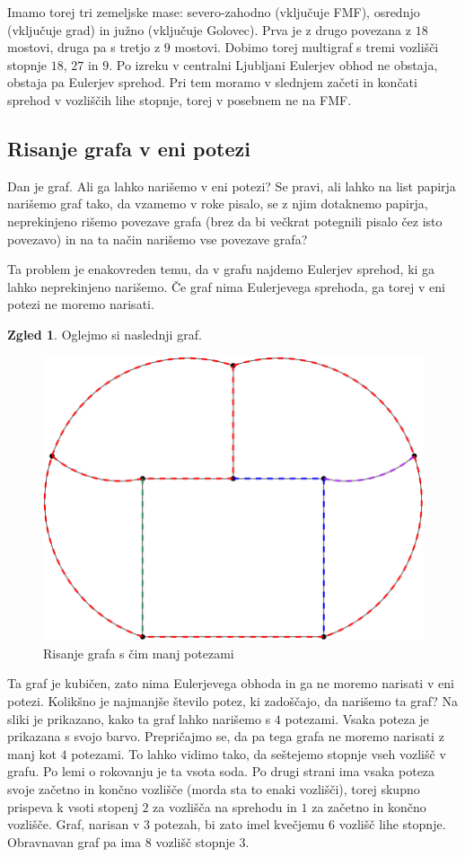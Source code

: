 \documentclass[11pt]{book}
\theoremstyle{definition}
\theoremstyle{zgled}
\newtheorem*{zgled}{Zgled}
\theoremstyle{odprtproblem}
\theoremstyle{domacanaloga}
\theoremstyle{izrek}
\begin{document}
Imamo torej tri zemeljske mase: severo-zahodno (vključuje FMF), osrednjo (vključuje grad) in južno (vključuje Golovec). Prva je z drugo povezana z $18$ mostovi, druga pa s tretjo z $9$ mostovi. Dobimo torej multigraf s tremi vozlišči stopnje $18$, $27$ in $9$. Po izreku v centralni Ljubljani Eulerjev obhod ne obstaja, obstaja pa Eulerjev sprehod. Pri tem moramo v slednjem začeti in končati sprehod v vozliščih lihe stopnje, torej v posebnem ne na FMF.

\subsection{Risanje grafa v eni potezi}

Dan je graf. Ali ga lahko narišemo v eni potezi? Se pravi, ali lahko na list papirja narišemo graf tako, da vzamemo v roke pisalo, se z njim dotaknemo papirja, neprekinjeno rišemo povezave grafa (brez da bi večkrat potegnili pisalo čez isto povezavo) in na ta način narišemo vse povezave grafa? 

Ta problem je enakovreden temu, da v grafu najdemo Eulerjev sprehod, ki ga lahko neprekinjeno narišemo. Če graf nima Eulerjevega sprehoda, ga torej v eni potezi ne moremo narisati.

\begin{zgled}
Oglejmo si naslednji graf.

\begin{figure}[h]
    \centering
    \includegraphics[width=0.5\linewidth]{img/grafi-enapoteza.png}
    \caption{Risanje grafa s čim manj potezami}
\end{figure}    

Ta graf je kubičen, zato nima Eulerjevega obhoda in ga ne moremo narisati v eni potezi. Kolikšno je najmanjše število potez, ki zadoščajo, da narišemo ta graf? Na sliki je prikazano, kako ta graf lahko narišemo s $4$ potezami. Vsaka poteza je prikazana s svojo barvo. Prepričajmo se, da pa tega grafa ne moremo narisati z manj kot $4$ potezami. To lahko vidimo tako, da seštejemo stopnje vseh vozlišč v grafu. Po lemi o rokovanju je ta vsota soda. Po drugi strani ima vsaka poteza svoje začetno in končno vozlišče (morda sta to enaki vozlišči), torej skupno prispeva k vsoti stopenj $2$ za vozlišča na sprehodu in $1$ za začetno in končno vozlišče. Graf, narisan v $3$ potezah, bi zato imel kvečjemu $6$ vozlišč lihe stopnje. Obravnavan graf pa ima $8$ vozlišč stopnje $3$.
\end{zgled}
\end{document}
